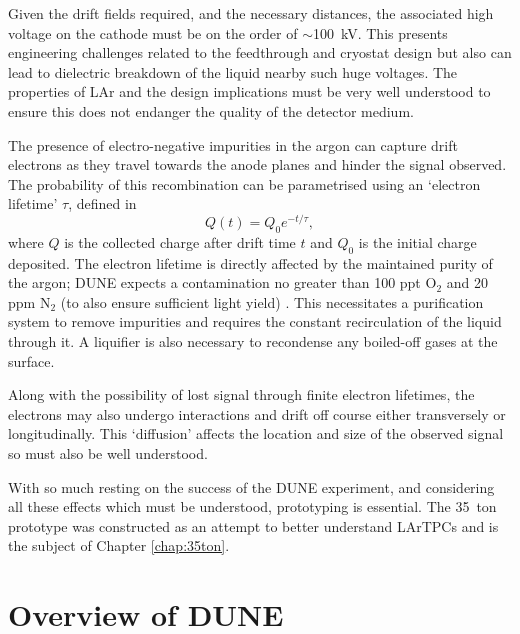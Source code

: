 Given the drift fields required, and the necessary distances, the associated high voltage on the cathode must be on the order of $\sim$100~kV.  This presents engineering challenges related to the feedthrough and cryostat design but also can lead to dielectric breakdown of the liquid nearby such huge voltages.  The properties of LAr and the design implications must be very well understood to ensure this does not endanger the quality of the detector medium.

The presence of electro-negative impurities in the argon can capture drift electrons as they travel towards the anode planes and hinder the signal observed.  The probability of this recombination can be parametrised using an `electron lifetime' $\tau$, defined in
\begin{equation}\label{eq:ElectronLifetime}
  Q(t) = Q_0 e^{-t/\tau},
\end{equation}
where $Q$ is the collected charge after drift time $t$ and $Q_0$ is the initial charge deposited.  The electron lifetime is directly affected by the maintained purity of the argon; DUNE expects a contamination no greater than 100 ppt O$_2$ and 20 ppm N$_2$ (to also ensure sufficient light yield) \cite{DUNECDR4}.  This necessitates a purification system to remove impurities and requires the constant recirculation of the liquid through it.  A liquifier is also necessary to recondense any boiled-off gases at the surface.

Along with the possibility of lost signal through finite electron lifetimes, the electrons may also undergo interactions and drift off course either transversely or longitudinally.  This `diffusion' affects the location and size of the observed signal so must also be well understood.

With so much resting on the success of the DUNE experiment, and considering all these effects which must be understood, prototyping is essential.  The 35~ton prototype was constructed as an attempt to better understand LArTPCs and is the subject of Chapter \ref{chap:35ton}.

\section{Overview of DUNE}\label{sec:DUNEOverview}

